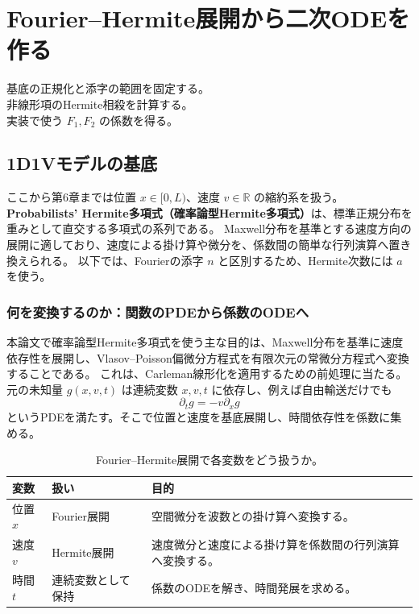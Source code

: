 \chapter{Fourier--Hermite展開から二次ODEを作る}
\begin{chaptergoal}
\cgitem 基底の正規化と添字の範囲を固定する。\\
\cgitem 非線形項のHermite相殺を計算する。\\
\cgitem 実装で使う $F_1,F_2$ の係数を得る。
\end{chaptergoal}

\section{1D1Vモデルの基底}
ここから第6章までは位置 $x\in[0,L)$、速度 $v\in\mathbb R$ の縮約系を扱う。
\textbf{Probabilists' Hermite多項式（確率論型Hermite多項式）}は、標準正規分布を重みとして直交する多項式の系列である。
Maxwell分布を基準とする速度方向の展開に適しており、速度による掛け算や微分を、係数間の簡単な行列演算へ置き換えられる。
以下では、Fourierの添字 $n$ と区別するため、Hermite次数には $a$ を使う。

\subsection{何を変換するのか：関数のPDEから係数のODEへ}
本論文で確率論型Hermite多項式を使う主な目的は、Maxwell分布を基準に速度依存性を展開し、Vlasov--Poisson偏微分方程式を有限次元の常微分方程式へ変換することである。
これは、Carleman線形化を適用するための前処理に当たる。
元の未知量 $g(x,v,t)$ は連続変数 $x,v,t$ に依存し、例えば自由輸送だけでも
\[
\partial_tg=-v\partial_xg
\]
というPDEを満たす。そこで位置と速度を基底展開し、時間依存性を係数に集める。

\begin{table}[htbp]
\centering\small
\caption{Fourier--Hermite展開で各変数をどう扱うか。}
\begin{tabularx}{\textwidth}{llX}
\toprule 変数 & 扱い & 目的 \\\midrule
位置 $x$ & Fourier展開 & 空間微分を波数との掛け算へ変換する。\\
速度 $v$ & Hermite展開 & 速度微分と速度による掛け算を係数間の行列演算へ変換する。\\
時間 $t$ & 連続変数として保持 & 係数のODEを解き、時間発展を求める。\\
\bottomrule
\end{tabularx}
\end{table}

